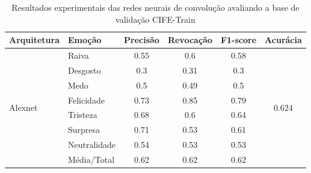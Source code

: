 \begin{table}[]
\centering
\caption{Resultados experimentais das redes neurais de convolução avaliando a base de validação CIFE-Train}
\label{table:cife-train}
\begin{tabular}{llcccc}
\hline
\textbf{Arquitetura}                   & \textbf{Emoção}       & \multicolumn{1}{l}{\textbf{Precisão}} & \multicolumn{1}{l}{\textbf{Revocação}} & \multicolumn{1}{l}{\textbf{F1-score}} & \multicolumn{1}{l}{\textbf{Acurácia}} \\ \hline
\multirow{8}{*}{Alexnet}         & Raiva                 & 0.55                                  & 0.6                                    & 0.58                                  & \multirow{8}{*}{0.624}                \\
                                       & Desgosto              & 0.3                                   & 0.31                                   & 0.3                                   &                                       \\
                                       & Medo                  & 0.5                                   & 0.49                                   & 0.5                                   &                                       \\
                                       & Felicidade            & 0.73                                  & 0.85                                   & 0.79                                  &                                       \\
                                       & Tristeza              & 0.68                                  & 0.6                                    & 0.64                                  &                                       \\
                                       & Surpresa              & 0.71                                  & 0.53                                   & 0.61                                  &                                       \\
                                       & Neutralidade          & 0.54                                  & 0.53                                   & 0.53                                  &                                       \\
                                       & Média/Total           & 0.62                                  & 0.62                                   & 0.62                                  &                                       \\ \hline

\end{tabular}
\end{table}
